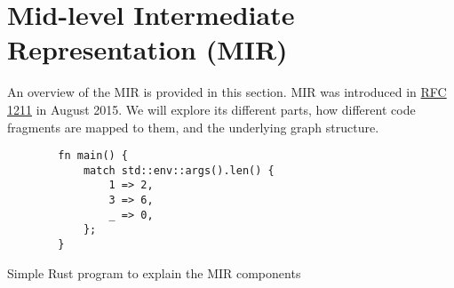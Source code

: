\documentclass[../Thesis.tex]{subfiles}
\begin{document}
\section{Mid-level Intermediate Representation (MIR)}

An overview of the \acrfull{MIR} is provided in this section.
\acrshort{MIR} was introduced in
\href{https://rust-lang.github.io/rfcs/1211-mir.html}{RFC 1211}
in August 2015.
We will explore its different parts,
how different code fragments are mapped to them,
and the underlying graph structure.

\begin{listing}
    \begin{verbatim}
        fn main() {
            match std::env::args().len() {
                1 => 2,
                3 => 6,
                _ => 0,
            };
        }
    \end{verbatim}
    \caption{Simple Rust program to explain the MIR components}
    \label{lst:rust-code-example}
\end{listing}
\end{document}
